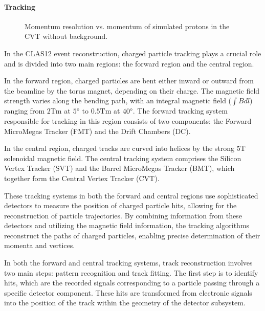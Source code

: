 \paragraph{Tracking}
    \begin{wrapfigure}{r}{0.50\textwidth}
        \centering{}
        \caption[CVT momentum resolution vs. momentum.]{Momentum resolution vs. momentum of simulated protons in the CVT without background.}
        \label{fig::cvt_pres}
    \end{wrapfigure}

    In the CLAS12 event reconstruction, charged particle tracking plays a crucial role and is divided into two main regions: the forward region and the central region.

    In the forward region, charged particles are bent either inward or outward from the beamline by the torus magnet, depending on their charge.
    The magnetic field strength varies along the bending path, with an integral magnetic field ($\int Bdl$) ranging from $2 \text{Tm}$ at $5\degree$ to $0.5 \text{Tm}$ at $40\degree$.
    The forward tracking system responsible for tracking in this region consists of two components: the Forward MicroMegas Tracker (FMT) and the Drift Chambers (DC).

    In the central region, charged tracks are curved into helices by the strong $5 \text{T}$ solenoidal magnetic field.
    The central tracking system comprises the Silicon Vertex Tracker (SVT) and the Barrel MicroMegas Tracker (BMT), which together form the Central Vertex Tracker (CVT).

    These tracking systems in both the forward and central regions use sophisticated detectors to measure the position of charged particle hits, allowing for the reconstruction of particle trajectories.
    By combining information from these detectors and utilizing the magnetic field information, the tracking algorithms reconstruct the paths of charged particles, enabling precise determination of their momenta and vertices.

    In both the forward and central tracking systems, track reconstruction involves two main steps: pattern recognition and track fitting.
    The first step is to identify hits, which are the recorded signals corresponding to a particle passing through a specific detector component.
    These hits are transformed from electronic signals into the position of the track within the geometry of the detector subsystem.

